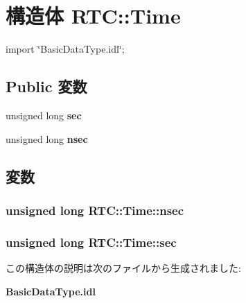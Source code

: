 \section{構造体 RTC::Time}
\label{structRTC_1_1Time}


{\ttfamily import \char`\"{}BasicDataType.idl\char`\"{};}

\subsection*{Public 変数}
\begin{DoxyCompactItemize}
\item 
unsigned long {\bf sec}
\item 
unsigned long {\bf nsec}
\end{DoxyCompactItemize}


\subsection{変数}
\subsubsection[{nsec}]{\setlength{\rightskip}{0pt plus 5cm}unsigned long {\bf RTC::Time::nsec}}\label{structRTC_1_1Time_af90fdb43cc4cd394cc9e097e673821be}
\subsubsection[{sec}]{\setlength{\rightskip}{0pt plus 5cm}unsigned long {\bf RTC::Time::sec}}\label{structRTC_1_1Time_a1ed073c8e58d7465a571f839514d53a5}


この構造体の説明は次のファイルから生成されました:\begin{DoxyCompactItemize}
\item 
{\bf BasicDataType.idl}\end{DoxyCompactItemize}
